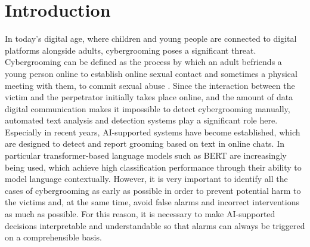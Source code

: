 \chapter{Introduction} 

In today's digital age, where children and young people are connected to digital platforms alongside adults, cybergrooming poses a significant threat. Cybergrooming can be defined as the process by which an adult befriends a young person online to establish online sexual contact and sometimes a physical meeting with them, to commit sexual abuse \cite{webster2021european}. Since the interaction between the victim and the perpetrator initially takes place online, and the amount of data digital communication makes it impossible to detect cybergrooming manually\cite{hamm2025llms}, automated text analysis and detection systems play a significant role here. Especially in recent years, AI-supported systems have become established, which are designed to detect and report grooming based on text in online chats. In particular transformer-based language models such as BERT\cite{devlin2019bert} are increasingly being used, which achieve high classification performance through their ability to model language contextually. However, it is very important to identify all the cases of cybergrooming as early as possible  in order to prevent potential harm to the victims \cite{vogt2021early} and, at the same time, avoid false alarms and incorrect interventions as much as possible. For this reason, it is necessary to make AI-supported decisions interpretable and understandable so that alarms can always be triggered on a comprehensible basis.

